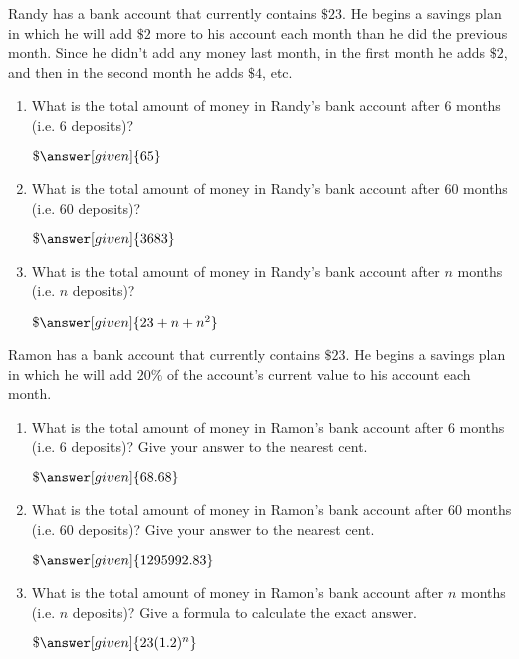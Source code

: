 \documentclass[nooutcomes]{ximera}
\begin{document}
\begin{problem}
Randy has a bank account that currently contains $\$23$.  He begins a savings plan in which he will add $\$2$ more to his account each month than he did the previous month.  Since he didn't add any money last month, in the first month he adds $\$2$, and then in the second month he adds $\$4$, etc.  

\begin{enumerate}
\item What is the total amount of money in Randy's bank account after $6$ months (i.e. $6$ deposits)? \begin{prompt} $\$\answer[given]{65}$\end{prompt}
\item What is the total amount of money in Randy's bank account after $60$ months (i.e. $60$ deposits)? \begin{prompt} $\$\answer[given]{3683}$\end{prompt}
\item What is the total amount of money in Randy's bank account after $n$ months (i.e. $n$ deposits)? \begin{prompt} $\$\answer[given]{23+n+n^2}$\end{prompt}
\end{enumerate}
\end{problem}



\begin{problem}
Ramon has a bank account that currently contains $\$23$.  He begins a savings plan in which he will add $20\%$ of the account's current value to his account each month.  

\begin{enumerate}
\item What is the total amount of money in Ramon's bank account after $6$ months (i.e. $6$ deposits)?  Give your answer to the nearest cent. \begin{prompt} $\$\answer[given]{68.68}$\end{prompt}
\item What is the total amount of money in Ramon's bank account after $60$ months (i.e. $60$ deposits)? Give your answer to the nearest cent. \begin{prompt} $\$\answer[given]{1295992.83}$\end{prompt}
\item What is the total amount of money in Ramon's bank account after $n$ months (i.e. $n$ deposits)?  Give a formula to calculate the exact answer. \begin{prompt} $\$\answer[given]{23(1.2)^n}$\end{prompt}
\end{enumerate}
\end{problem}
\end{document}
